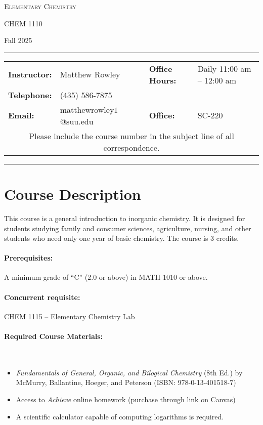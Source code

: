 \documentclass[12pt, letterpaper]{article}
\begin{document}
\begin{center}
	{\Large \textsc{Elementary Chemistry}}

	CHEM 1110
\end{center}

\begin{center}
	{\large Fall 2025}
\end{center}
\begin{center}
	\rule{0.99\textwidth}{0.4pt}
	\begin{tabular}{llcll}
		\textbf{Instructor:} & Matthew Rowley           &  & \textbf{Office Hours:} & Daily 11:00 am -- 12:00 am \\
		\textbf{Telephone:}  & (435) 586-7875           &  &                        &  \\
		\textbf{Email:}      & matthewrowley$1$@suu.edu &  & \textbf{Office:}       & SC-220                   \\
		\multicolumn{5}{c}{Please include the course number in the subject line of all correspondence.}
	\end{tabular}
	\rule{0.99\textwidth}{0.4pt}
\end{center}

\section*{Course Description}
This course is a general introduction to inorganic chemistry. It is designed for students studying family and consumer sciences, agriculture, nursing, and other students who need only one year of basic chemistry. The course is 3 credits.

\paragraph{Prerequisites:}
A minimum grade of ``C'' (2.0 or above) in MATH 1010 or above.

\paragraph{Concurrent requisite:}
CHEM 1115 -- Elementary Chemistry Lab

\paragraph{Required Course Materials:} ~

\begin{itemize}
	\item \emph{Fundamentals of General, Organic, and Bilogical Chemistry} (8th Ed.) by McMurry, Ballantine, Hoeger, and Peterson (ISBN: 978-0-13-401518-7)
	\item Access to \emph{Achieve} online homework (purchase through link on Canvas)
	\item A scientific calculator capable of computing logarithms is required.
\end{itemize}
\end{document}
